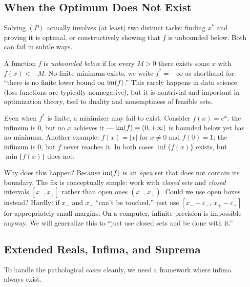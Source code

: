 \subsection{When the Optimum Does Not Exist}\label{ssec:unbounded}

Solving $(P)$ actually involves (at least) two distinct tasks: finding $x^*$ and proving it is optimal, or constructively showing that $f$ is unbounded below.
Both can fail in subtle ways.

\begin{defn}\label{def:unbounded-below}
	A function $f$ is \textit{unbounded below} if for every $M > 0$ there exists some $x$ with $f(x) < -M$. No finite minimum exists; we write $f^* = -\infty$ as shorthand for ``there is no finite lower bound on $\operatorname{im}(f)$.''
	This rarely happens in data science (loss functions are typically nonnegative), but it is nontrivial and important in optimization theory, tied to duality and nonemptiness of feasible sets.
\end{defn}

Even when $f^*$ is finite, a minimizer may fail to exist. Consider $f(x) = e^x$: the infimum is $0$, but no $x$ achieves it --- $\operatorname{im}(f) = (0, +\infty)$ is bounded below yet has no minimum. Another example: $f(x) = |x|$ for $x \neq 0$ and $f(0) = 1$; the infimum is $0$, but $f$ never reaches it. In both cases $\inf\{f(x)\}$ exists, but $\min\{f(x)\}$ does not.

Why does this happen? Because $\operatorname{im}(f)$ is an \textit{open} set that does not contain its boundary. The fix is conceptually simple: work with \textit{closed} sets and \textit{closed} intervals $[x_-, x_+]$ rather than open ones $(x_-, x_+)$. Could we use open boxes instead? Hardly: if $x_-$ and $x_+$ ``can't be touched,'' just use $[x_- + \varepsilon_-, \, x_+ - \varepsilon_+]$ for appropriately small margins. On a computer, infinite precision is impossible anyway. We will generalize this to ``just use closed sets and be done with it.''


\subsection{Extended Reals, Infima, and Suprema}\label{ssec:extended-reals}

To handle the pathological cases cleanly, we need a framework where infima always exist.

